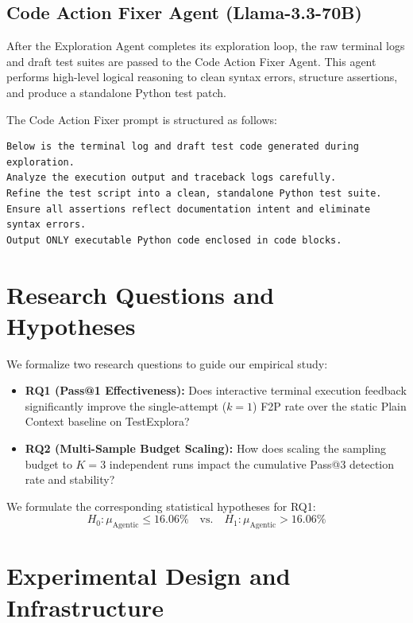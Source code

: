 \documentclass[conference]{IEEEtran}
\begin{document}
\subsection{Code Action Fixer Agent (Llama-3.3-70B)}
After the Exploration Agent completes its exploration loop, the raw terminal logs and draft test suites are passed to the Code Action Fixer Agent. This agent performs high-level logical reasoning to clean syntax errors, structure assertions, and produce a standalone Python test patch.

The Code Action Fixer prompt is structured as follows:
\begin{lstlisting}
Below is the terminal log and draft test code generated during exploration.
Analyze the execution output and traceback logs carefully.
Refine the test script into a clean, standalone Python test suite.
Ensure all assertions reflect documentation intent and eliminate syntax errors.
Output ONLY executable Python code enclosed in code blocks.
\end{lstlisting}

\section{Research Questions and Hypotheses}

We formalize two research questions to guide our empirical study:

\begin{itemize}
    \item \textbf{RQ1 (Pass@1 Effectiveness):} Does interactive terminal execution feedback significantly improve the single-attempt ($k=1$) F2P rate over the static Plain Context baseline on TestExplora?
    \item \textbf{RQ2 (Multi-Sample Budget Scaling):} How does scaling the sampling budget to $K=3$ independent runs impact the cumulative Pass@3 detection rate and stability?
\end{itemize}

We formulate the corresponding statistical hypotheses for RQ1:
\begin{equation}
H_0: \mu_{\text{Agentic}} \le 16.06\% \quad \text{vs.} \quad H_1: \mu_{\text{Agentic}} > 16.06\%
\end{equation}

\section{Experimental Design and Infrastructure}
\end{document}
